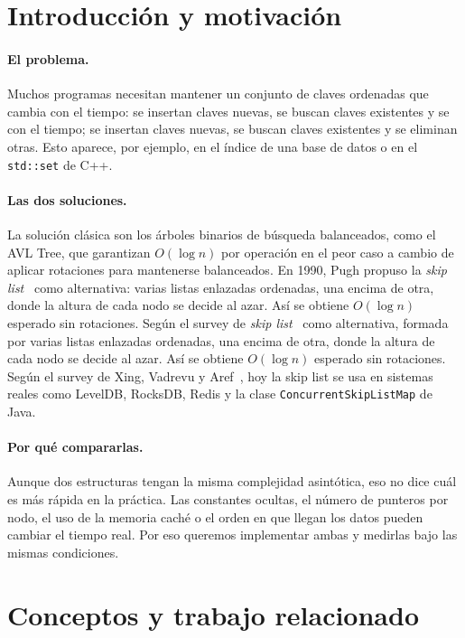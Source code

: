 \documentclass[11pt,a4paper]{article}
\begin{document}
\section{Introducción y motivación}

\paragraph{El problema.}
Muchos programas necesitan mantener un conjunto de claves ordenadas que cambia
con el tiempo: se insertan claves nuevas, se buscan claves existentes y se
con el tiempo; se insertan claves nuevas, se buscan claves existentes y se
eliminan otras. Esto aparece, por ejemplo, en el índice de una base de datos o en
el \texttt{std::set} de C++.

\paragraph{Las dos soluciones.}
La solución clásica son los árboles binarios de búsqueda balanceados, como el
AVL Tree, que garantizan $O(\log n)$ por operación en el peor caso a cambio
de aplicar rotaciones para mantenerse balanceados. En 1990, Pugh propuso la
\emph{skip list}~\cite{pugh1990} como alternativa: varias listas enlazadas
ordenadas, una encima de otra, donde la altura de cada nodo se decide al azar.
Así se obtiene $O(\log n)$ esperado sin rotaciones. Según el survey de
\emph{skip list}~\cite{pugh1990} como alternativa, formada por varias listas
enlazadas ordenadas, una encima de otra, donde la altura de cada nodo se decide
al azar. Así se obtiene $O(\log n)$ esperado sin rotaciones. Según el survey de
Xing, Vadrevu y Aref~\cite{vadrevu2024}, hoy la skip list se usa en sistemas
reales como LevelDB, RocksDB, Redis y la clase
\texttt{ConcurrentSkipListMap} de Java.

\paragraph{Por qué compararlas.}
Aunque dos estructuras tengan la misma complejidad asintótica, eso no dice cuál
es más rápida en la práctica. Las constantes ocultas, el número de punteros por nodo,
el uso de la memoria caché o el orden en que llegan los datos pueden cambiar el
tiempo real. Por eso queremos implementar ambas y medirlas bajo las mismas condiciones.


\section{Conceptos y trabajo relacionado}\label{sec:conceptos}
\end{document}
